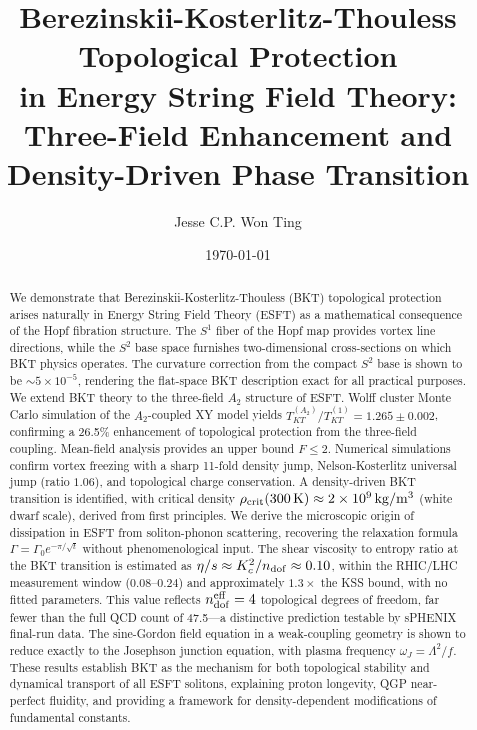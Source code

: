 ﻿\documentclass[twocolumn,showpacs,preprintnumbers,amsmath,amssymb,prd]{revtex4-2}
\begin{document}
\title{Berezinskii-Kosterlitz-Thouless Topological Protection\\in Energy String Field Theory:\\Three-Field Enhancement and Density-Driven Phase Transition}

\author{Jesse C.P. Won Ting}

\date{\today}

\begin{abstract}
We demonstrate that Berezinskii-Kosterlitz-Thouless (BKT) topological protection arises naturally in Energy String Field Theory (ESFT) as a mathematical consequence of the Hopf fibration structure. The $S^1$ fiber of the Hopf map provides vortex line directions, while the $S^2$ base space furnishes two-dimensional cross-sections on which BKT physics operates. The curvature correction from the compact $S^2$ base is shown to be $\sim 5 \times 10^{-5}$, rendering the flat-space BKT description exact for all practical purposes. We extend BKT theory to the three-field $A_2$ structure of ESFT. Wolff cluster Monte Carlo simulation of the $A_2$-coupled XY model yields $T_{KT}^{(A_2)}/T_{KT}^{(1)} = 1.265 \pm 0.002$, confirming a 26.5\% enhancement of topological protection from the three-field coupling. Mean-field analysis provides an upper bound $F \leq 2$. Numerical simulations confirm vortex freezing with a sharp 11-fold density jump, Nelson-Kosterlitz universal jump (ratio $1.06$), and topological charge conservation. A density-driven BKT transition is identified, with critical density $\rho_{\rm crit}(300\,{\rm K}) \approx 2 \times 10^9\,{\rm kg/m^3}$ (white dwarf scale), derived from first principles. We derive the microscopic origin of dissipation in ESFT from soliton-phonon scattering, recovering the relaxation formula $\Gamma = \Gamma_0 e^{-\pi/\sqrt{t}}$ without phenomenological input. The shear viscosity to entropy ratio at the BKT transition is estimated as $\eta/s \approx K_c^2/n_{\rm dof} \approx 0.10$, within the RHIC/LHC measurement window ($0.08$--$0.24$) and approximately $1.3\times$ the KSS bound, with no fitted parameters. This value reflects $n_{\rm dof}^{\rm eff} = 4$ topological degrees of freedom, far fewer than the full QCD count of 47.5---a distinctive prediction testable by sPHENIX final-run data. The sine-Gordon field equation in a weak-coupling geometry is shown to reduce exactly to the Josephson junction equation, with plasma frequency $\omega_J = \Lambda^2/f$. These results establish BKT as the mechanism for both topological stability and dynamical transport of all ESFT solitons, explaining proton longevity, QGP near-perfect fluidity, and providing a framework for density-dependent modifications of fundamental constants.
\end{abstract}
\end{document}
